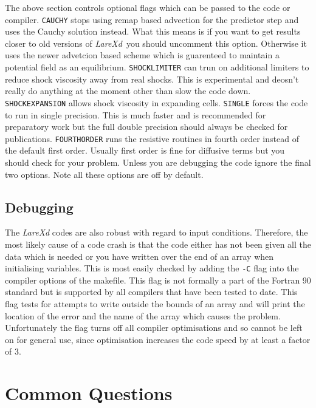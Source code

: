 \documentclass[11pt]{article}
\newcommand{\lare}{{\it LareXd}\ }
\begin{document}
The above section controls optional flags which can be passed to the code or compiler. 
\texttt{CAUCHY} stops using remap based advection for the predictor step and uses the Cauchy solution instead. 
What this means is if you want to get results closer to old versions of \lare you should uncomment this option. Otherwise it 
uses the newer advetcion based scheme which is guarenteed to maintain a potential field as an equilibrium.
\texttt{SHOCKLIMITER} can trun on additional limiters to reduce shock viscosity away from real shocks. This is
experimental and deosn't really do anything at the moment other than slow the code down.
\texttt{SHOCKEXPANSION} allows shock viscosity in expanding cells. 
\texttt{SINGLE} forces the code 
to run in single precision. This is much faster and is recommended for preparatory work but the full double precision 
should always be checked for publications. \texttt{FOURTHORDER} runs the resistive routines in fourth order instead of 
the default first order. Usually first order is fine for diffusive terms but you should
check for your problem. Unless you are debugging the code ignore the final two options. Note all these options are
off by default.

\subsection{Debugging}
The {\it LareXd} codes are also robust with regard to input conditions. Therefore, the most likely cause of a code crash 
is that the code either has not been given all the data which is needed or you have written over the end of an array 
when initialising variables. This is most easily checked by adding the \texttt{-C} flag into the compiler options of the 
makefile. This flag is not formally a part of the Fortran 90 standard but is supported by all compilers that have been 
tested to date. This flag tests for attempts to write outside the bounds of an array and will print the location of the 
error and the name of the array which causes the problem. Unfortunately the flag turns off all compiler optimisations 
and so cannot be left on for general use, since optimisation increases the code speed by at least a factor of 3.

\section{Common Questions}
\end{document}
